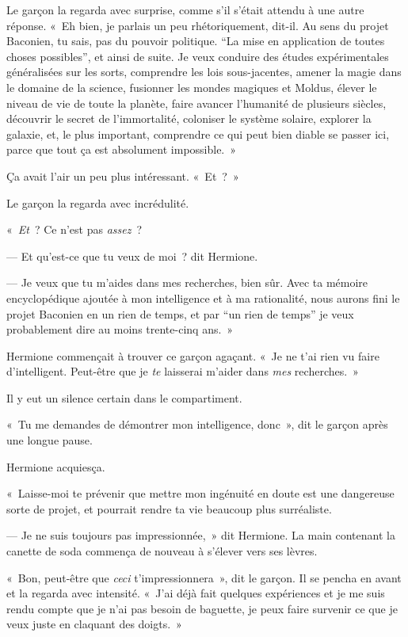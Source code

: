 Le garçon la regarda avec surprise, comme s'il s'était attendu à une autre réponse. «~Eh bien, je parlais un peu rhétoriquement, dit-il. Au sens du projet Baconien, tu sais, pas du pouvoir politique. “La mise en application de toutes choses possibles”, et ainsi de suite. Je veux conduire des études expérimentales généralisées sur les sorts, comprendre les lois sous-jacentes, amener la magie dans le domaine de la science, fusionner les mondes magiques et Moldus, élever le niveau de vie de toute la planète, faire avancer l'humanité de plusieurs siècles, découvrir le secret de l'immortalité, coloniser le système solaire, explorer la galaxie, et, le plus important, comprendre ce qui peut bien diable se passer ici, parce que tout ça est absolument impossible.~»

Ça avait l'air un peu plus intéressant. «~Et~?~»

Le garçon la regarda avec incrédulité.

«~\emph{Et}~? Ce n'est pas \emph{assez}~?

--- Et qu'est-ce que tu veux de moi~? dit Hermione.

--- Je veux que tu m'aides dans mes recherches, bien sûr. Avec ta mémoire encyclopédique ajoutée à mon intelligence et à ma rationalité, nous aurons fini le projet Baconien en un rien de temps, et par “un rien de temps” je veux probablement dire au moins trente-cinq ans.~»

Hermione commençait à trouver ce garçon agaçant. «~Je ne t'ai rien vu faire d'intelligent. Peut-être que je \emph{te} laisserai m'aider dans \emph{mes} recherches.~»

Il y eut un silence certain dans le compartiment.

«~Tu me demandes de démontrer mon intelligence, donc~», dit le garçon après une longue pause.

Hermione acquiesça.

«~Laisse-moi te prévenir que mettre mon ingénuité en doute est une dangereuse sorte de projet, et pourrait rendre ta vie beaucoup plus surréaliste.

--- Je ne suis toujours pas impressionnée,~» dit Hermione. La main contenant la canette de soda commença de nouveau à s'élever vers ses lèvres.

«~Bon, peut-être que \emph{ceci} t'impressionnera~», dit le garçon. Il se pencha en avant et la regarda avec intensité. «~J'ai déjà fait quelques expériences et je me suis rendu compte que je n'ai pas besoin de baguette, je peux faire survenir ce que je veux juste en claquant des doigts.~»

